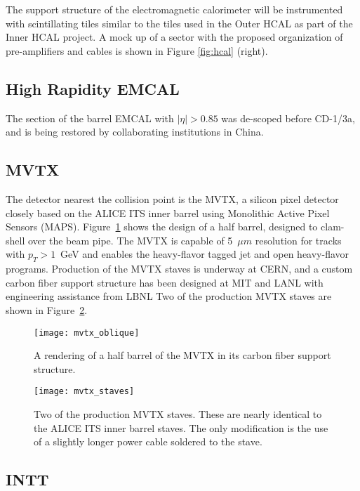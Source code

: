 The support structure of the electromagnetic calorimeter will be instrumented
with scintillating tiles similar to the tiles used in the Outer HCAL as part of the
Inner HCAL project. 
A mock up of a sector with the proposed organization of pre-amplifiers and cables is shown in Figure \ref{fig:hcal} (right).

\subsection{High Rapidity EMCAL} 

The section of the barrel EMCAL with $|\eta|>0.85$ was de-scoped before
CD-1/3a, and is being restored by collaborating institutions in China.

\subsection{MVTX}

The detector nearest the collision point is the MVTX, a silicon pixel
detector closely based on the ALICE ITS inner barrel using Monolithic Active Pixel Sensors (MAPS). 
Figure~\ref{fig:mvtx_oblique} shows the design of a half barrel, designed
to clam-shell over the beam pipe.  
The MVTX is capable of 5~$\mu m$ resolution for
tracks with $p_T > 1$~GeV and enables the heavy-flavor tagged jet
and open heavy-flavor programs.  
Production of the MVTX staves is
underway at CERN, and a custom carbon fiber support structure
has been designed at MIT and LANL with engineering assistance from LBNL
Two of the production MVTX staves are shown in Figure~\ref{fig:mvtx_staves}.

\begin{figure}[hbt!]
  \centering
  \texttt{[image: mvtx\_oblique]}
  \caption{A rendering of a half barrel of the MVTX in its carbon
    fiber support structure.}
  \label{fig:mvtx_oblique}
\end{figure}

\begin{figure}[hbt!]
  \centering
  \texttt{[image: mvtx\_staves]}
  \caption{Two of the production MVTX staves.  These are nearly
    identical to the ALICE ITS inner barrel staves.  The only
    modification is the use of a slightly longer power cable soldered
    to the stave.}
  \label{fig:mvtx_staves}
\end{figure}

\subsection{INTT}

